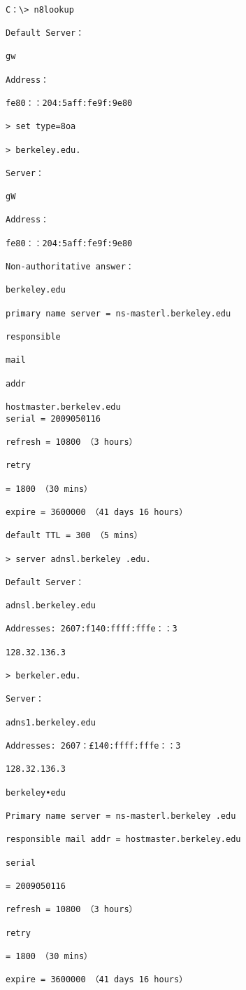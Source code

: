 \begin{verbatim}
    
C：\> n8lookup

Default Server：

gw

Address：

fe80：：204:5aff:fe9f:9e80

> set type=8oa

> berkeley.edu.

Server：

gW

Address：

fe80：：204:5aff:fe9f:9e80

Non-authoritative answer：

berkeley.edu

primary name server = ns-masterl.berkeley.edu

responsible

mail

addr

hostmaster.berkelev.edu
serial = 2009050116

refresh = 10800 （3 hours）

retry

= 1800 （30 mins）

expire = 3600000 （41 days 16 hours）

default TTL = 300 （5 mins）

> server adnsl.berkeley .edu.

Default Server：

adnsl.berkeley.edu

Addresses: 2607:f140:ffff:fffe：：3

128.32.136.3

> berkeler.edu.

Server：

adns1.berkeley.edu

Addresses: 2607：£140:ffff:fffe：：3

128.32.136.3

berkeley•edu

Primary name server = ns-masterl.berkeley .edu

responsible mail addr = hostmaster.berkeley.edu

serial

= 2009050116

refresh = 10800 （3 hours）

retry

= 1800 （30 mins）

expire = 3600000 （41 days 16 hours）


\end{verbatim}

